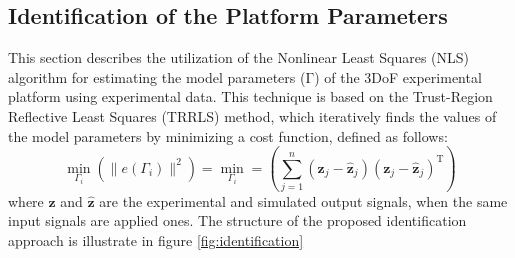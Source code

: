 \documentclass[3p,times]{elsarticle}
\begin{document}
\subsection{Identification of the Platform Parameters}
\noindent This section describes the utilization of the Nonlinear Least Squares (NLS) algorithm for estimating the model parameters ($\boldsymbol{\mathrm{\Gamma}}$) of the 3DoF experimental platform using experimental data. This technique is based on the Trust-Region Reflective Least Squares (TRRLS) method, which iteratively finds the values of the model parameters by minimizing a cost function, defined as follows:
\begin{equation}
	\min_{\Gamma_i}\left(\parallel e(\Gamma_i) \parallel^2\right) = 
	\min_{\Gamma_i} = \left(\sum_{j=1}^{n}(\boldsymbol{z}_j- \hat{\boldsymbol{z}}_j)(\boldsymbol{z}_j- \hat{\boldsymbol{z}}_j)^\mathrm{T}\right)
\end{equation}
where $\boldsymbol{z}$ and $\hat{\boldsymbol{z}}$ are the experimental and simulated output signals, when the same input signals are applied ones.
The structure of the proposed identification approach is illustrate in figure \ref{fig:identification}


\end{document}
